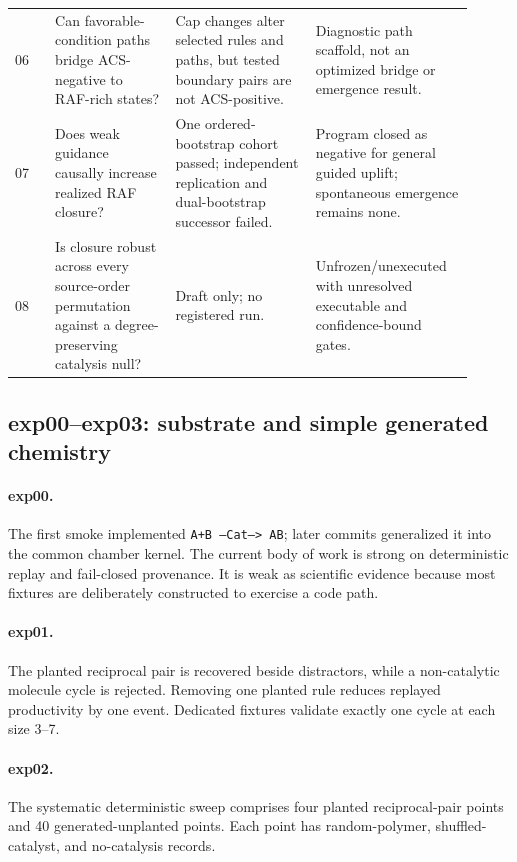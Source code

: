 \documentclass[11pt]{article}
\newcommand{\code}[1]{\texttt{#1}}
\begin{document}
\begin{longtable}{p{0.08\linewidth}p{0.24\linewidth}p{0.29\linewidth}p{0.30\linewidth}}
06 & Can favorable-condition paths bridge ACS-negative to RAF-rich states? &
Cap changes alter selected rules and paths, but tested boundary pairs are not
ACS-positive. & Diagnostic path scaffold, not an optimized bridge or emergence
result. \\
07 & Does weak guidance causally increase realized RAF closure? &
One ordered-bootstrap cohort passed; independent replication and dual-bootstrap
successor failed. & Program closed as negative for general guided uplift;
spontaneous emergence remains none. \\
08 & Is closure robust across every source-order permutation against a
degree-preserving catalysis null? & Draft only; no registered run. &
Unfrozen/unexecuted with unresolved executable and confidence-bound gates. \\
\bottomrule
\end{longtable}
\normalsize

\subsection{exp00--exp03: substrate and simple generated chemistry}

\paragraph{exp00.}
The first smoke implemented
\code{A+B --Cat--> AB}; later commits generalized it into the common chamber
kernel.  The current body of work is strong on deterministic replay and
fail-closed provenance.  It is weak as scientific evidence because most
fixtures are deliberately constructed to exercise a code path.

\paragraph{exp01.}
The planted reciprocal pair is recovered beside distractors, while a
non-catalytic molecule cycle is rejected.  Removing one planted rule reduces
replayed productivity by one event.  Dedicated fixtures validate exactly one
cycle at each size 3--7.

\paragraph{exp02.}
The systematic deterministic sweep comprises four planted reciprocal-pair
points and 40 generated-unplanted points.  Each point has random-polymer,
shuffled-catalyst, and no-catalysis records.
\end{document}
